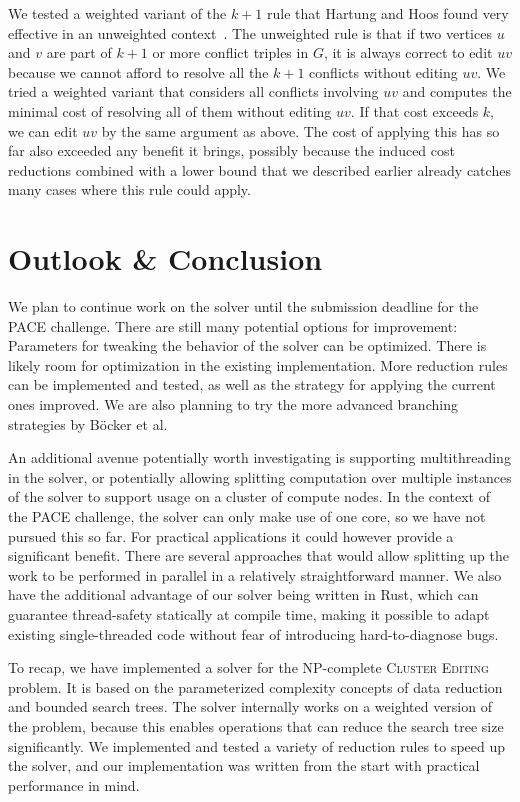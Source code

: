 \documentclass[12pt,oneside,english,parskip=full,headings=small]{scrbook}
\theoremstyle{definition}
\begin{document}
We tested a weighted variant of the $k+1$ rule that Hartung and Hoos found very effective in an
unweighted context~\cite{HartungHoos}. The unweighted rule is that if two vertices $u$ and $v$ are
part of $k + 1$ or more conflict triples in $G$, it is always correct to edit $uv$ because we cannot
afford to resolve all the $k + 1$ conflicts without editing $uv$. We tried a weighted variant that
considers all conflicts involving $uv$ and computes the minimal cost of resolving all of them
without editing $uv$. If that cost exceeds $k$, we can edit $uv$ by the same argument as above. The
cost of applying this has so far also exceeded any benefit it brings, possibly because the induced
cost reductions combined with a lower bound that we described earlier already catches many cases
where this rule could apply.

\chapter{Outlook \& Conclusion}

We plan to continue work on the solver until the submission deadline for the PACE challenge. There
are still many potential options for improvement: Parameters for tweaking the behavior of the
solver can be optimized. There is likely room for optimization in the existing implementation. More
reduction rules can be implemented and tested, as well as the strategy for applying the current ones
improved. We are also planning to try the more advanced branching strategies by Böcker et
al.~\cite{GoldenRatio}

An additional avenue potentially worth investigating is supporting multithreading in the solver, or
potentially allowing splitting computation over multiple instances of the solver to support usage on
a cluster of compute nodes. In the context of the PACE challenge, the solver can only make use of
one core, so we have not pursued this so far. For practical applications it could however provide a
significant benefit. There are several approaches that would allow splitting up the work to be
performed in parallel in a relatively straightforward manner. We also have the additional advantage
of our solver being written in Rust, which can guarantee thread-safety statically at compile time,
making it possible to adapt existing single-threaded code without fear of introducing
hard-to-diagnose bugs.

To recap, we have implemented a solver for the NP-complete \textsc{Cluster Editing} problem. It is
based on the parameterized complexity concepts of data reduction and bounded search trees. The
solver internally works on a weighted version of the problem, because this enables operations that
can reduce the search tree size significantly. We implemented and tested a variety of reduction
rules to speed up the solver, and our implementation was written from the start with practical
performance in mind.
\end{document}
